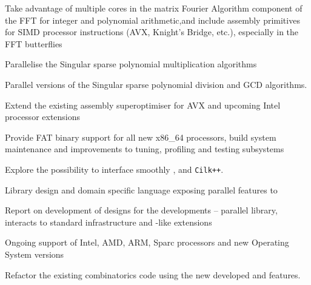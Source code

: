 \begin{workpackage}
\begin{wpdelivs}
  \begin{wpdeliv}[due=12,id=FFT,dissem=PU,nature=DEM]
    {Take advantage of multiple cores in the matrix Fourier Algorithm component of the FFT
      for integer and polynomial arithmetic,and include assembly primitives for SIMD
      processor instructions (AVX, Knight's Bridge, etc.), especially in the FFT
      butterflies}
\end{wpdeliv}
  \begin{wpdeliv}[due=12,id=singular-polymul,dissem=PU,nature=DEM]
      {Parallelise the Singular sparse polynomial multiplication algorithms}
\end{wpdeliv}
  \begin{wpdeliv}[due=12,id=singular-polyarith,dissem=PU,nature=DEM]
      {Parallel versions of the Singular sparse polynomial division and GCD algorithms.}
\end{wpdeliv}
  \begin{wpdeliv}[due=12,id=MPIRsuperoptimiser,dissem=PU,nature=DEM]
      {Extend the existing assembly superoptimiser for AVX and upcoming Intel processor extensions}
\end{wpdeliv}
  \begin{wpdeliv}[due=12,id=MPIRfat,dissem=PU,nature=DEM]
      {Provide FAT binary support for all new x86\_64 processors, build system maintenance and improvements to tuning, profiling and testing subsystems}
\end{wpdeliv}
  \begin{wpdeliv}[due=12,id=HPCcombi,dissem=PU,nature=DEM]
      {Explore the possibility to    interface smoothly \Pythran, \Cython and \texttt{Cilk++}.}
\end{wpdeliv}
  \begin{wpdeliv}[due=12,id=LinBox-DSL,dissem=PU,nature=R]
    {Library design and domain specific language exposing \Linbox parallel features to \Sage}
  \end{wpdeliv}
  \begin{wpdeliv}[due=18,id=GAP-hpc-report,dissem=PU,nature=R]
    {Report on development of designs for the \GAP developments --
      parallel library, interacts to standard infrastructure and
      \Cython-like extensions }
  \end{wpdeliv}
  \begin{wpdeliv}[due=24,id=MPIRprocessors,dissem=PU,nature=DEM]
      {Ongoing support of Intel, AMD, ARM, Sparc processors and new Operating System versions}
\end{wpdeliv}
  \begin{wpdeliv}[due=24,id=HPCcombi,dissem=PU,nature=DEM]
      {Refactor the existing combinatorics \Sage    code using the new developed  \Pythran and \Cython features.}
\end{wpdeliv}


\end{wpdelivs}
\end{workpackage}
